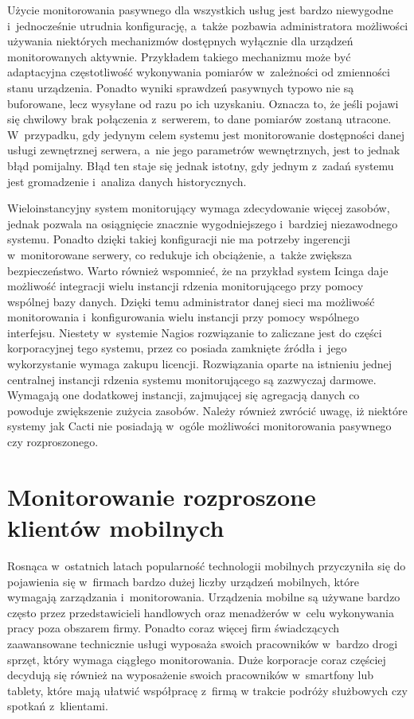 Użycie monitorowania pasywnego dla wszystkich usług jest bardzo
niewygodne i~jednocześnie utrudnia konfigurację, a~także pozbawia
administratora możliwości używania niektórych mechanizmów dostępnych
wyłącznie dla urządzeń monitorowanych aktywnie. Przykładem takiego
mechanizmu może być adaptacyjna częstotliwość wykonywania pomiarów
w~zależności od zmienności stanu urządzenia. Ponadto wyniki sprawdzeń
pasywnych typowo nie są buforowane, lecz wysyłane od razu po ich
uzyskaniu. Oznacza to, że jeśli pojawi się chwilowy brak połączenia
z~serwerem, to dane pomiarów zostaną utracone. W~przypadku, gdy
jedynym celem systemu jest monitorowanie dostępności danej usługi
zewnętrznej serwera, a~nie jego parametrów wewnętrznych, jest to jednak
błąd pomijalny. Błąd ten staje się jednak istotny, gdy jednym z~zadań
systemu jest gromadzenie i~analiza danych historycznych.

Wieloinstancyjny system monitorujący wymaga zdecydowanie więcej
zasobów, jednak pozwala na osiągnięcie znacznie wygodniejszego
i~bardziej niezawodnego systemu. Ponadto dzięki takiej konfiguracji
nie ma potrzeby ingerencji w~monitorowane serwery, co redukuje ich
obciążenie, a~także zwiększa bezpieczeństwo. Warto również wspomnieć,
że na przykład system Icinga daje możliwość integracji wielu instancji
rdzenia monitorującego przy pomocy wspólnej bazy danych. Dzięki temu
administrator danej sieci ma możliwość monitorowania i~konfigurowania
wielu instancji przy pomocy wspólnego interfejsu. Niestety w~systemie
Nagios rozwiązanie to zaliczane jest do części korporacyjnej tego
systemu, przez co posiada zamknięte źródła i~jego wykorzystanie wymaga
zakupu licencji. Rozwiązania oparte na istnieniu jednej centralnej
instancji rdzenia systemu monitorującego są zazwyczaj
darmowe. Wymagają one dodatkowej instancji, zajmującej się agregacją
danych co powoduje zwiększenie zużycia zasobów. Należy również zwrócić
uwagę, iż niektóre systemy jak Cacti nie posiadają w~ogóle możliwości
monitorowania pasywnego czy rozproszonego.

\section[Monitorowanie rozproszone][Monitorowanie rozproszone klientów
mobilnych]{Monitorowanie rozproszone klientów mobilnych}

Rosnąca w~ostatnich latach popularność technologii mobilnych
przyczyniła się do pojawienia się w~firmach bardzo dużej liczby
urządzeń mobilnych, które wymagają zarządzania
i~monitorowania. Urządzenia mobilne są używane bardzo często przez
przedstawicieli handlowych oraz menadżerów w~celu wykonywania pracy
poza obszarem firmy. Ponadto coraz więcej firm świadczących
zaawansowane technicznie usługi wyposaża swoich pracowników w~bardzo
drogi sprzęt, który wymaga ciągłego monitorowania. Duże korporacje
coraz częściej decydują się również na wyposażenie swoich pracowników
w~smartfony lub tablety, które mają ułatwić współpracę z~firmą w
trakcie podróży służbowych czy spotkań z~klientami.

